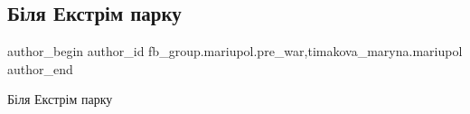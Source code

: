  
 
 
 
 

\subsection{Біля Екстрім парку}
\label{sec:11_04_2023.fb.fb_group.mariupol.pre_war.1.ekstrim_park}
 
\ifcmt
 author_begin
   author_id fb_group.mariupol.pre_war,timakova_maryna.mariupol
 author_end
\fi

Біля Екстрім парку


